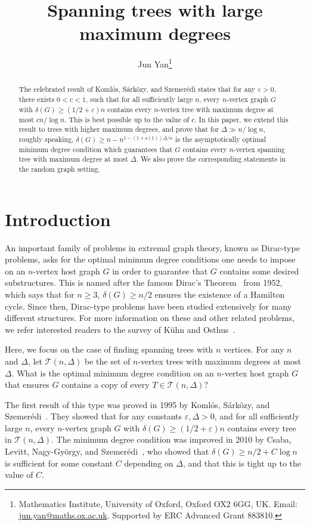 \documentclass{article}
\title{Spanning trees with large maximum degrees}
\theoremstyle{plain}
\theoremstyle{definition}
\numberwithin{equation}{section}
\def\eps{\varepsilon}
\newcommand\cT{\mathcal{T}}
\begin{document}
\author{Jun Yan\thanks{Mathematics Institute, University of Oxford, Oxford OX2 6GG, UK. Email: \url{jun.yan@maths.ox.ac.uk}. Supported by
ERC Advanced Grant 883810.}}

\maketitle

\begin{abstract}
The celebrated result of Koml\'os, S\'ark\"ozy, and Szemer\'edi states that for any $\eps>0$, there exists $0<c<1$, such that for all sufficiently large $n$, every $n$-vertex graph $G$ with $\delta(G)\geq(1/2+\eps)n$ contains every $n$-vertex tree with maximum degree at most $cn/\log n$. This is best possible up to the value of $c$. In this paper, we extend this result to trees with higher maximum degrees, and prove that for $\Delta\gg n/\log n$, roughly speaking, $\delta(G)\geq n-n^{1-(1+o(1))\Delta/n}$ is the asymptotically optimal minimum degree condition which guarantees that $G$ contains every $n$-vertex spanning tree with maximum degree at most $\Delta$. We also prove the corresponding statements in the random graph setting. 
\end{abstract}

\section{Introduction}
An important family of problems in extremal graph theory, known as Dirac-type problems, asks for the optimal minimum degree conditions one needs to impose on an $n$-vertex host graph $G$ in order to guarantee that $G$ contains some desired substructures. This is named after the famous Dirac's Theorem~{\cite[Theorem 3]{D}} from 1952, which says that for $n\geq3$, $\delta(G)\geq n/2$ ensures the existence of a Hamilton cycle. Since then, Dirac-type problems have been studied extensively for many different structures. For more information on these and other related problems, we refer interested readers to the survey of K\"uhn and Osthus~\cite{KO}. 

Here, we focus on the case of finding spanning trees with $n$ vertices. For any $n$ and $\Delta$, let $\cT(n,\Delta)$ be the set of $n$-vertex trees with maximum degrees at most $\Delta$. What is the optimal minimum degree condition on an $n$-vertex host graph $G$ that ensures $G$ contains a copy of every $T\in\cT(n,\Delta)$? 

The first result of this type was proved in 1995 by Koml\'os, S\'ark\"ozy, and Szemer\'edi~{\cite[Theorem 1.1]{KSS1}}. They showed that for any constants $\eps,\Delta>0$, and for all sufficiently large $n$, every $n$-vertex graph $G$ with $\delta(G)\geq(1/2+\eps)n$ contains every tree in $\cT(n,\Delta)$. The minimum degree condition was improved in 2010 by Csaba, Levitt, Nagy-Gy\"orgy, and Szemer\'edi~{\cite[Theorem 1]{CLNGS}}, who showed that $\delta(G)\geq n/2+C\log n$ is sufficient for some constant $C$ depending on $\Delta$, and that this is tight up to the value of $C$. 
\end{document}
